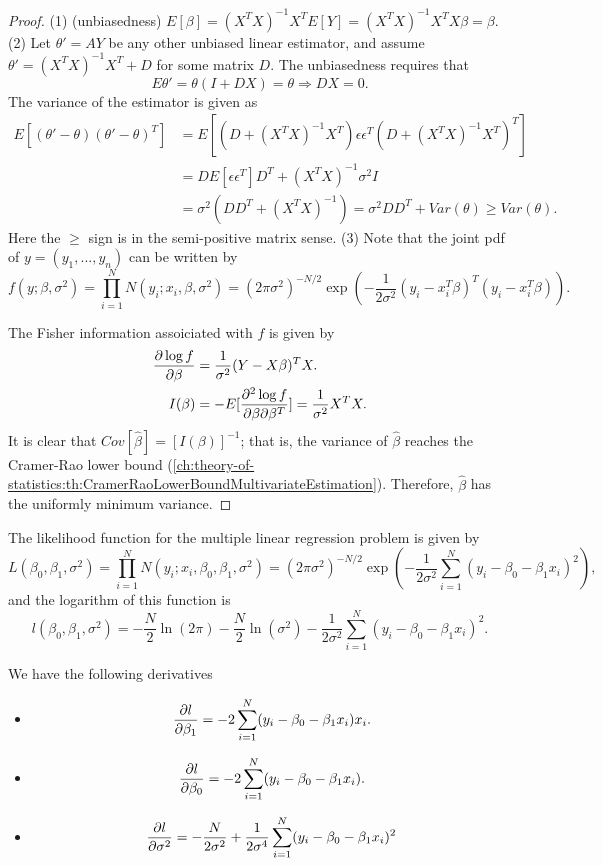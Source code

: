 \begin{refsection}
\begin{proof}
	(1) (unbiasedness) $E[\beta] = (X^TX)^{-1}X^T E[Y] = (X^TX)^{-1}X^TX\beta = \beta.$
	(2) Let $\theta' = AY $ be any other unbiased linear estimator, and assume $\theta' = (X^TX)^{-1}X^T + D $ for some matrix $D$. The unbiasedness requires that $$E\theta' = \theta(I + DX) = \theta \Rightarrow DX = 0.$$
	The variance of the estimator is given as
	\begin{align*}
	E[(\theta' - \theta)(\theta' - \theta)^T] &= E[(D + (X^TX)^{-1}X^T)\epsilon\epsilon^T(D+(X^TX)^{-1}X^T)^T]\\
	&=DE[\epsilon\epsilon^T]D^T + (X^TX)^{-1} \sigma^2 I \\
	&=\sigma^2 (DD^T + (X^TX)^{-1}) = \sigma^2 DD^T + Var(\theta) \geq Var(\theta).
	\end{align*} 
	Here the $\geq$ sign is in the semi-positive matrix sense.  
	(3) Note that the joint pdf of $y= (y_1,...,y_n)$ can be written by
$$f(y;\beta, \sigma^2) = \prod_{i=1}^{N} N(y_i;x_i,\beta, \sigma^2) = (2\pi\sigma^2)^{-N/2}\exp(-\frac{1}{2\sigma^2}(y_i-x_i^T\beta)^T(y_i-x_i^T\beta)).$$

The Fisher information assoiciated with $f$ is given by
\begin{align*}
\frac{\partial \log f}{\partial \beta} &= \frac{1}{\sigma^2}(Y-X\beta)^TX. \\
I(\beta) &= -E[\frac{\partial^2 \log f}{\partial \beta\partial \beta^T}] = \frac{1}{\sigma^2}X^TX.
\end{align*}
It is clear that $Cov[\hat{\beta}] = [I(\beta)]^{-1}$; that is, the variance of $\hat{\beta}$ reaches the Cramer-Rao lower bound (\autoref{ch:theory-of-statistics:th:CramerRaoLowerBoundMultivariateEstimation}). Therefore, $\hat{\beta}$ has the uniformly minimum variance. 
\end{proof}


\begin{corollary}
The likelihood function for the multiple linear regression problem is given by	
$$L(\beta_0,\beta_1, \sigma^2) = \prod_{i=1}^{N} N(y_i;x_i,\beta_0,\beta_1, \sigma^2) = (2\pi\sigma^2)^{-N/2}\exp(-\frac{1}{2\sigma^2}\sum_{i=1}^{N}(y_i-\beta_0-\beta_1x_i)^2),$$
and the logarithm of this function is
$$l(\beta_0,\beta_1, \sigma^2) = -\frac{N}{2}\ln(2\pi)-\frac{N}{2}\ln(\sigma^2) -\frac{1}{2\sigma^2}\sum_{i=1}^{N}(y_i-\beta_0-\beta_1x_i)^2.$$

We have the following derivatives
\begin{itemize}
	\item 
	$$\frac{\partial l}{\partial \beta_1} = -2\sum_{i=1}^{N}(y_i-\beta_0-\beta_1x_i)x_i.$$
	\item
	$$\frac{\partial l}{\partial \beta_0} = -2\sum_{i=1}^{N}(y_i-\beta_0-\beta_1x_i).$$
	\item 
	$$\frac{\partial l}{\partial \sigma^2} = -\frac{N}{2\sigma^2} + \frac{1}{2\sigma^4}\sum_{i=1}^{N}(y_i-\beta_0-\beta_1x_i)^2 $$
\end{itemize}	


\end{corollary}
\end{refsection}
